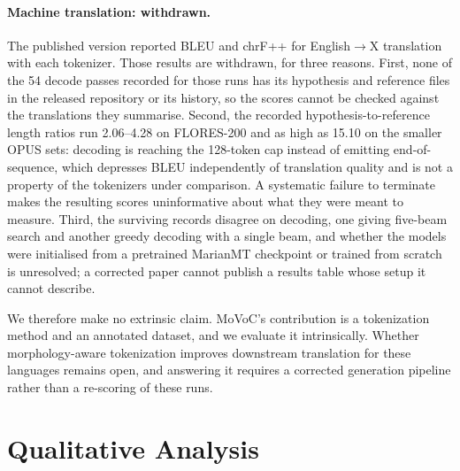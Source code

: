 \documentclass[11pt]{article}
\newcommand{\movoctok}{MoVoC-Tok}
\begin{document}
\begin{table}[t]
  \centering
  \small
  \resizebox{\columnwidth}{!}{}
  \caption{Morpheme boundary precision and Rényi entropy ($\alpha=2$, nats)
  for 32k vocabularies, on words held out from \movoctok{}'s training morpheme
  resource (Section~\ref{sec:heldout}). For Tigre and Ge'ez ($*$) the Tigrinya
  \movoctok{} is applied cross-lingually.}
  \label{tab:intrinsic}
\end{table}

\paragraph{Machine translation: withdrawn.} The published version reported
BLEU and chrF++ for English$\rightarrow$X translation with each tokenizer.
Those results are withdrawn, for three reasons. First, none of the 54 decode
passes
recorded for those runs has its hypothesis and reference files in the released
repository or its history, so the scores cannot be checked against the
translations they summarise. Second, the recorded hypothesis-to-reference
length ratios run 2.06--4.28 on FLORES-200 and as high as 15.10 on the smaller
OPUS sets: decoding is reaching the 128-token cap instead of emitting
end-of-sequence, which depresses BLEU independently of translation quality and
is not a property of the tokenizers under comparison. A systematic failure to
terminate makes the resulting scores uninformative about what they were meant
to measure. Third, the
surviving records disagree on decoding, one giving five-beam search and
another greedy decoding with a single beam, and whether the models were
initialised from a pretrained MarianMT checkpoint or trained from scratch is
unresolved; a corrected paper cannot publish a results table whose setup it
cannot describe.

We therefore make no extrinsic claim. MoVoC's contribution is a tokenization
method and an annotated dataset, and we evaluate it intrinsically. Whether
morphology-aware tokenization improves downstream translation for these
languages remains open, and answering it requires a corrected generation
pipeline rather than a re-scoring of these runs.

\section{Qualitative Analysis}
\label{sec:qualitative}
\end{document}
